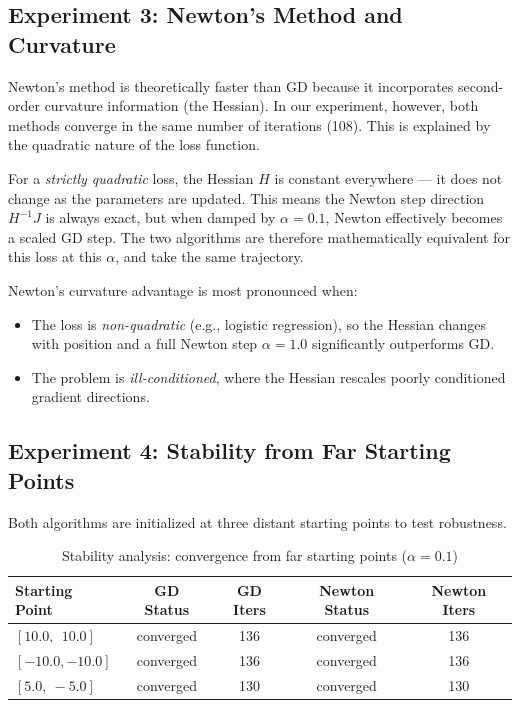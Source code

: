 \documentclass[12pt,a4paper]{article}
\begin{document}
\subsection{Experiment 3: Newton's Method and Curvature}

Newton's method is theoretically faster than GD because it incorporates second-order
curvature information (the Hessian). In our experiment, however, both methods converge
in the same number of iterations (108). This is explained by the quadratic nature of
the loss function.

For a \textit{strictly quadratic} loss, the Hessian $H$ is constant everywhere — it
does not change as the parameters are updated. This means the Newton step direction
$H^{-1}J$ is always exact, but when damped by $\alpha = 0.1$, Newton effectively
becomes a scaled GD step. The two algorithms are therefore mathematically equivalent
for this loss at this $\alpha$, and take the same trajectory.

Newton's curvature advantage is most pronounced when:
\begin{itemize}[noitemsep]
    \item The loss is \textit{non-quadratic} (e.g., logistic regression), so the
    Hessian changes with position and a full Newton step \(\alpha = 1.0\) significantly
    outperforms GD.
    \item The problem is \textit{ill-conditioned}, where the Hessian rescales poorly
    conditioned gradient directions.
\end{itemize}

\subsection{Experiment 4: Stability from Far Starting Points}

Both algorithms are initialized at three distant starting points to test robustness.

\begin{table}[H]
\centering
\caption{Stability analysis: convergence from far starting points ($\alpha = 0.1$)}
\begin{tabular}{lcccc}
    \toprule
    Starting Point & GD Status & GD Iters & Newton Status & Newton Iters \\
    \midrule
    $[10.0,\ \ 10.0]$  & converged & 136 & converged & 136 \\
    $[-10.0, -10.0]$ & converged & 136 & converged & 136 \\
    $[5.0,\  -5.0]$  & converged & 130 & converged & 130 \\
    \bottomrule
\end{tabular}
\end{table}
\end{document}
